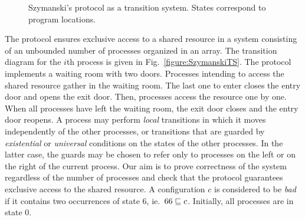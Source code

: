\begin{wrapfigure}{r}[2pt]{0.6\textwidth}
\begin{center}
  \end{center}
  \vspace{-7mm}
  \caption{Szymanski's protocol as a transition system. States
    correspond to program locations.}
  \vspace{-6mm}
\end{wrapfigure}
The protocol ensures exclusive access to a shared resource in a system
consisting of an unbounded number of processes organized in an array.
%
The transition diagram for the $i$th process is given in
Fig.~\ref{figure:SzymanskiTS}.
%
The protocol implements a waiting room with two doors. %
Processes intending to access the shared resource gather in the
waiting room.
%
The last one to enter closes the entry door and opens the exit door.
%
Then, processes access the resource one by one.
%
%
When all processes have left the waiting room, the exit door closes
and the entry door reopens.
%
A process may perform {\it local} transitions in which
it moves independently of the other processes,
or transitions that are guarded by {\it existential} or 
{\it universal} conditions on the states of the other processes. 
%
In the latter case, the guards may be chosen to refer only to
processes on the left or on the right of the current process.
%
Our aim is to prove correctness of the system regardless of the number
of processes and check that the protocol guarantees exclusive access
to the shared resource. A configuration $c$ is considered to be
\emph{bad} if it contains two occurrences of state $6$, ie.\
$66\sqsubseteq c$. Initially, all processes are in state $0$.
